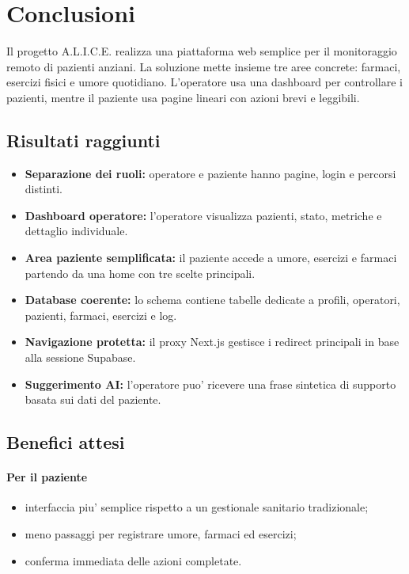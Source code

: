 \section{Conclusioni}

Il progetto A.L.I.C.E. realizza una piattaforma web semplice per il monitoraggio remoto di pazienti
anziani. La soluzione mette insieme tre aree concrete: farmaci, esercizi fisici e umore quotidiano.
L'operatore usa una dashboard per controllare i pazienti, mentre il paziente usa pagine lineari con
azioni brevi e leggibili.

\subsection{Risultati raggiunti}

\begin{itemize}
    \item \textbf{Separazione dei ruoli:} operatore e paziente hanno pagine, login e percorsi distinti.
    \item \textbf{Dashboard operatore:} l'operatore visualizza pazienti, stato, metriche e dettaglio individuale.
    \item \textbf{Area paziente semplificata:} il paziente accede a umore, esercizi e farmaci partendo da una home con tre scelte principali.
    \item \textbf{Database coerente:} lo schema contiene tabelle dedicate a profili, operatori, pazienti, farmaci, esercizi e log.
    \item \textbf{Navigazione protetta:} il proxy Next.js gestisce i redirect principali in base alla sessione Supabase.
    \item \textbf{Suggerimento AI:} l'operatore puo' ricevere una frase sintetica di supporto basata sui dati del paziente.
\end{itemize}

\subsection{Benefici attesi}

\paragraph{Per il paziente}
\begin{itemize}
    \item interfaccia piu' semplice rispetto a un gestionale sanitario tradizionale;
    \item meno passaggi per registrare umore, farmaci ed esercizi;
    \item conferma immediata delle azioni completate.
\end{itemize}

